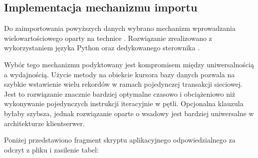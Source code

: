 \documentclass[letterpaper,10pt,english]{sphinxmanual}
\begin{document}
\subsection{Implementacja mechanizmu importu}
\label{\detokenize{rozdzial_4/index:implementacja-mechanizmu-importu}}
\sphinxAtStartPar
Do zaimportowania powyższych danych wybrano mechanizm wprowadzania wielowartościowego oparty na technice . Rozwiązanie zrealizowano z wykorzystaniem języka Python oraz dedykowanego sterownika .

\sphinxAtStartPar
Wybór tego mechanizmu podyktowany jest kompromisem między uniwersalnością a wydajnością. Użycie metody  na obiekcie kursora bazy danych pozwala na szybkie wstawienie wielu rekordów w ramach pojedynczej transakcji sieciowej. Jest to rozwiązanie znacznie bardziej optymalne czasowo i obciążeniowo niż wykonywanie pojedynczych instrukcji  iteracyjnie w pętli. Opcjonalna klauzula  byłaby szybsza, jednak rozwiązanie oparte o wsadowy  jest bardziej uniwersalne w architekturze klient\sphinxhyphen{}serwer.

\sphinxAtStartPar
Poniżej przedstawiono fragment skryptu aplikacyjnego odpowiedzialnego za odczyt z pliku i zasilenie tabel:
\end{document}
